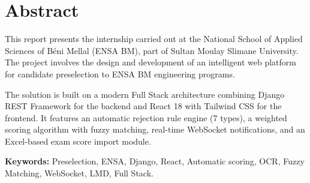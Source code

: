 \chapter*{Abstract}

This report presents the internship carried out at the National School of Applied Sciences of Béni Mellal (ENSA BM), part of Sultan Moulay Slimane University. The project involves the design and development of an intelligent web platform for candidate preselection to ENSA BM engineering programs.

The solution is built on a modern Full Stack architecture combining Django REST Framework for the backend and React 18 with Tailwind CSS for the frontend. It features an automatic rejection rule engine (7 types), a weighted scoring algorithm with fuzzy matching, real-time WebSocket notifications, and an Excel-based exam score import module.

\textbf{Keywords:} Preselection, ENSA, Django, React, Automatic scoring, OCR, Fuzzy Matching, WebSocket, LMD, Full Stack.
